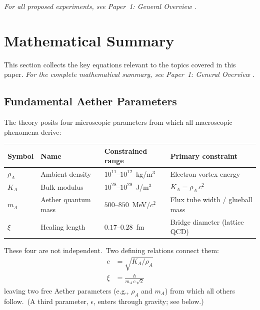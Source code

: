 ﻿\documentclass[12pt,letterpaper]{article}
\newcommand{\rhoa}{\rho_{\!A}}
\newcommand{\Ka}{K_{\!A}}
\begin{document}
\noindent\textit{For all proposed experiments, see Paper~1: General Overview \cite{otto-overview}.}


\section{Mathematical Summary}

This section collects the key equations relevant to the topics covered in this paper.
\noindent\textit{For the complete mathematical summary, see Paper~1: General Overview \cite{otto-overview}.}

\subsection{Fundamental Aether Parameters}

The theory posits four microscopic parameters from which all macroscopic
phenomena derive:
%
\begin{center}
\begin{tabular}{@{}llll@{}}
\hline
\textbf{Symbol} & \textbf{Name} & \textbf{Constrained range} & \textbf{Primary constraint} \\
\hline
$\rhoa$  & Ambient density     & $10^{11}$--$10^{12}$~kg/m$^3$         & Electron vortex energy \\
$\Ka$    & Bulk modulus         & $10^{28}$--$10^{29}$~J/m$^3$          & $\Ka = \rhoa\,c^2$ \\
$m_A$    & Aether quantum mass  & $500$--$850$~MeV/$c^2$                & Flux tube width / glueball mass \\
$\xi$    & Healing length       & $0.17$--$0.28$~fm                     & Bridge diameter (lattice QCD) \\
\hline
\end{tabular}
\end{center}

These four are not independent.\ Two defining relations connect them:
%
\begin{align}
  c &= \sqrt{\Ka / \rhoa}
    \label{eq:sum-speed-of-light} \\
  \xi &= \frac{\hbar}{m_A\,c\,\sqrt{2}}
    \label{eq:sum-healing-length}
\end{align}
%
leaving two free Aether parameters (e.g., $\rhoa$ and $m_A$) from which all
others follow.\ (A third parameter, $\epsilon$, enters through gravity; see below.)
\end{document}
